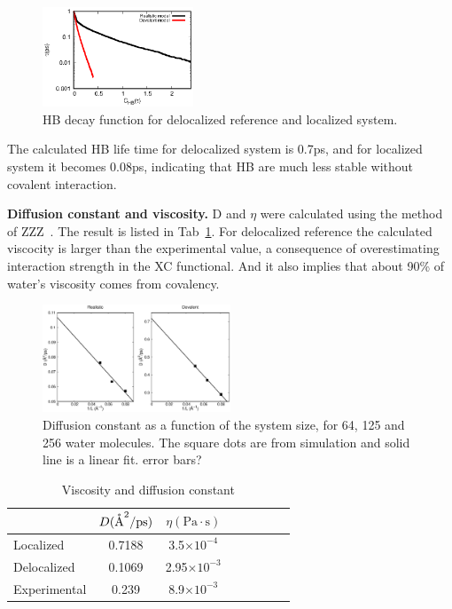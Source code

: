 \documentclass[prl,twocolumn,showpacs]{revtex4}
\begin{document}
\begin{figure}
\includegraphics[width=0.4\textwidth]{new_hbdecay}
\caption{HB decay function for delocalized reference and localized system.} \label{Fig:HBdecay}
\end{figure}

The calculated HB life time for delocalized system is 0.7ps, and for localized system it becomes 0.08ps, indicating that HB are much less stable without covalent interaction. 
 
 
\textbf{Diffusion constant and viscosity.} D and $\eta$ were calculated using the method of ZZZ~\cite{dunweg1993molecular}. The result is listed in Tab~\ref{Tab:dfs}. For delocalized reference the calculated viscocity is larger than the experimental value, a consequence of overestimating interaction strength in the XC functional. And it also implies that about 90\% of water's viscosity comes from covalency.

\begin{figure}
\includegraphics[width=0.5\textwidth]{msd}
\caption{Diffusion constant as a function of the system size, for 64, 125 and 256 water molecules. The square dots are from simulation and solid line is a linear fit. \new error bars?\old }\label{Fig:dfs}
\end{figure} 

\begin{table}
\caption{Viscosity and diffusion constant}\label{Tab:dfs}
\begin{tabular}{l*{6}{c}r}
\hline
               & $D(\mathring{\text{A}}^2/\text{ps})$ & $\eta(\text{Pa}\cdot \text{s})$ \\
\hline
Localized                & 0.7188 & 3.5$\times 10^{-4}$ \\

Delocalized              & 0.1069 & 2.95$\times 10^{-3}$\\

Experimental            & 0.239  & 8.9$\times 10^{-3} $


\end{tabular}

\end{table}
 
\end{document}
